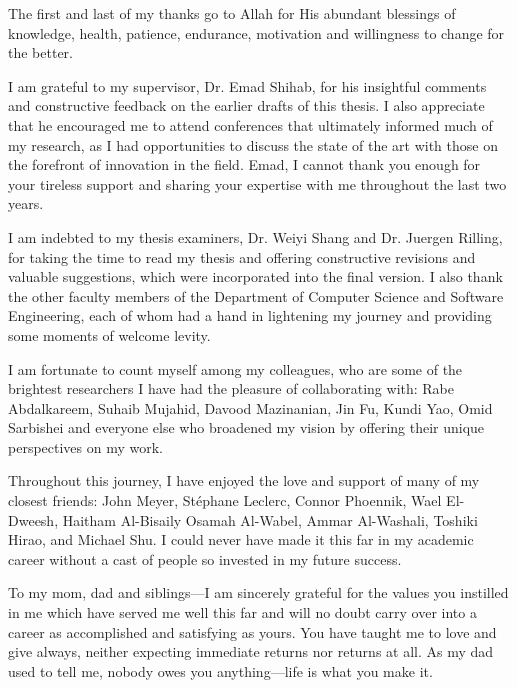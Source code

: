 \documentclass[12pt]{report}
\begin{document}
\begin{acknowledgments}

The first and last of my thanks go to Allah for His abundant blessings of knowledge, health, patience, endurance, motivation and willingness to change for the better.\\ \par

I am grateful to my supervisor, Dr. Emad Shihab, for his insightful comments and constructive feedback on the earlier drafts of this thesis. I also appreciate that he encouraged me to attend conferences that ultimately informed much of my research, as I had opportunities to discuss the state of the art with those on the forefront of innovation in the field. Emad, I cannot thank you enough for your tireless support and sharing your expertise with me throughout the last two years.\\
\par
I am indebted to my thesis examiners, Dr. Weiyi Shang and Dr. Juergen Rilling, for taking the time to read my thesis and offering constructive revisions and valuable suggestions, which were incorporated into the final version. I also thank the other faculty members of the Department of Computer Science and Software Engineering, each of whom had a hand in lightening my journey and providing some moments of welcome levity.\\ \par

I am fortunate to count myself among my colleagues, who are some of the brightest researchers I have had the pleasure of collaborating with: Rabe Abdalkareem, Suhaib Mujahid, Davood Mazinanian, Jin Fu, Kundi Yao, Omid Sarbishei and everyone else who broadened my vision by offering their unique perspectives on my work.\\ \par

Throughout this journey, I have enjoyed the love and support of many of my closest friends: John Meyer, St\'{e}phane Leclerc, Connor Phoennik, Wael El-Dweesh, Haitham Al-Bisaily Osamah Al-Wabel, Ammar Al-Washali, Toshiki Hirao, and Michael Shu. I could never have made it this far in my academic career without a cast of people so invested in my future success.\\ \par

To my mom, dad and siblings---I am sincerely grateful for the values you instilled in me which have served me well this far and will no doubt carry over into a career as accomplished and satisfying as yours. You have taught me to love and give always, neither expecting immediate returns nor returns at all. As my dad used to tell me, nobody owes you anything---life is what you make it. \\ \\ \\ \\ \\ \\ \\ \\ \\ \\


\end{acknowledgments}
\end{document}

